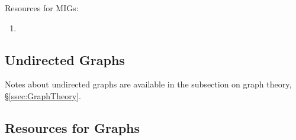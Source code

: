 Resources for MIGs: \vspace{-0.3cm}
\begin{enumerate} \itemsep -4pt
\item 
\end{enumerate}







\subsection{Undirected Graphs}
\label{ssec:UndirectedGraphs}

Notes about undirected graphs are available in the subsection on graph theory, \S\ref{ssec:GraphTheory}.




\subsection{Resources for Graphs}
\label{ssec:ResourcesForGraphs}

